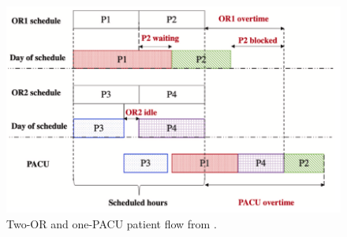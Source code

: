     \begin{figure}[H]
        \centering
        \includegraphics[width=.9\textwidth]{figures/SR0015US22/fig3.png}
        \caption{Two-OR and one-PACU patient flow from \cite{x335}.}
        \label{fig3:SR0015US22}
    \end{figure}

